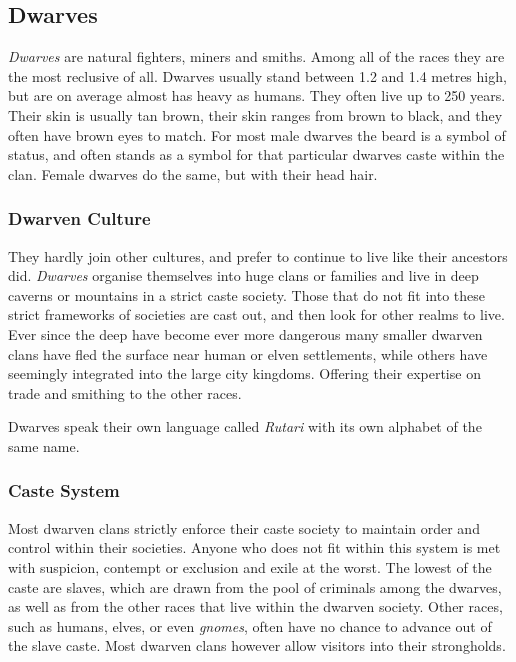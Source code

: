 \subsection*{Dwarves}

\emph{Dwarves} are natural fighters, miners and smiths. Among all of the races
they are the most reclusive of all. Dwarves usually stand between 1.2 and 1.4
metres high, but are on average almost has heavy as humans. They often live
up to 250 years. Their skin is usually tan brown, their skin ranges from brown
to black, and they often have brown eyes to match. For most male dwarves the
beard is a symbol of status, and often stands as a symbol for that particular
dwarves caste within the clan.  Female dwarves do the same, but with their
head hair.

\subsubsection*{Dwarven Culture}

They hardly join other cultures, and prefer to continue to live like their
ancestors did. \emph{Dwarves} organise themselves into huge clans or families
and live in deep caverns or mountains in a strict caste society. Those that do
not fit into these strict frameworks of societies are cast out, and then look
for other realms to live. Ever since the deep have become ever more dangerous
many smaller dwarven clans have fled the surface near human or elven
settlements, while others have seemingly integrated into the large city
kingdoms. Offering their expertise on trade and smithing to the other races.

Dwarves speak their own language called \emph{Rutari} with its own alphabet of
the same name.

\subsubsection*{Caste System}

Most dwarven clans strictly enforce their caste society to maintain order and
control within their societies. Anyone who does not fit within this system is
met with suspicion, contempt or exclusion and exile at the worst. The lowest
of the caste are slaves, which are drawn from the pool of criminals among the
dwarves, as well as from the other races that live within the dwarven society.
Other races, such as humans, elves, or even \emph{gnomes}, often have no chance
to advance out of the slave caste. Most dwarven clans however allow visitors
into their strongholds.

